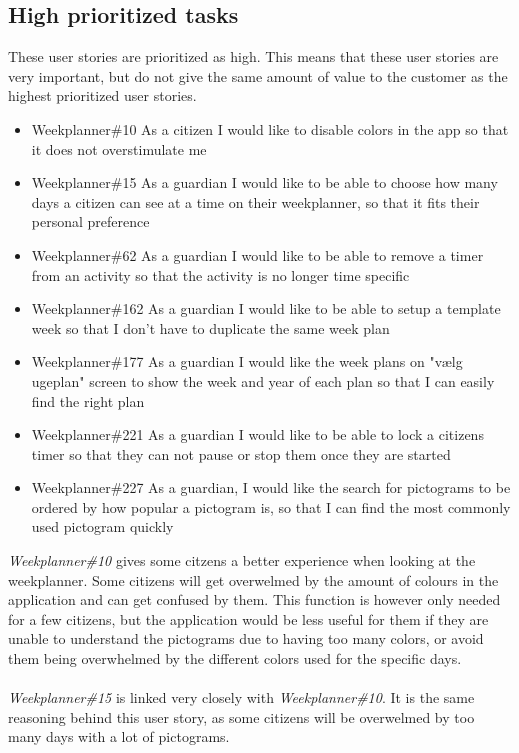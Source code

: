 \subsection{High prioritized tasks}
These user stories are prioritized as high. 
This means that these user stories are very important, but do not give the same amount of value to the customer as the highest prioritized user stories.
\begin{itemize}
    \item Weekplanner\#10 As a citizen I would like to disable colors in the app so that it does not overstimulate me
    \item Weekplanner\#15 As a guardian I would like to be able to choose how many days a citizen can see at a time on their weekplanner, so that it fits their personal preference 
    \item Weekplanner\#62 As a guardian I would like to be able to remove a timer from an activity so that the activity is no longer time specific
    \item Weekplanner\#162 As a guardian I would like to be able to setup a template week so that I don't have to duplicate the same week plan  
    \item Weekplanner\#177 As a guardian I would like the week plans on "vælg ugeplan" screen to show the week and year of each plan so that I can easily find the right plan 
    \item Weekplanner\#221 As a guardian I would like to be able to lock a citizens timer so that they can not pause or stop them once they are started
    \item Weekplanner\#227 As a guardian, I would like the search for pictograms to be ordered by how popular a pictogram is, so that I can find the most commonly used pictogram quickly
\end{itemize}
\noindent
\textit{Weekplanner\#10} gives some citzens a better experience when looking at the weekplanner. 
Some citizens will get overwelmed by the amount of colours in the application and can get confused by them. 
This function is however only needed for a few citizens, but the application would be less useful for them if they are unable to understand the pictograms due to having too many colors, or avoid them being overwhelmed by the different colors used for the specific days.
\\\\
\textit{Weekplanner\#15} is linked very closely with \textit{Weekplanner\#10}. 
It is the same reasoning behind this user story, as some citizens will be overwelmed by too many days with a lot of pictograms. 
